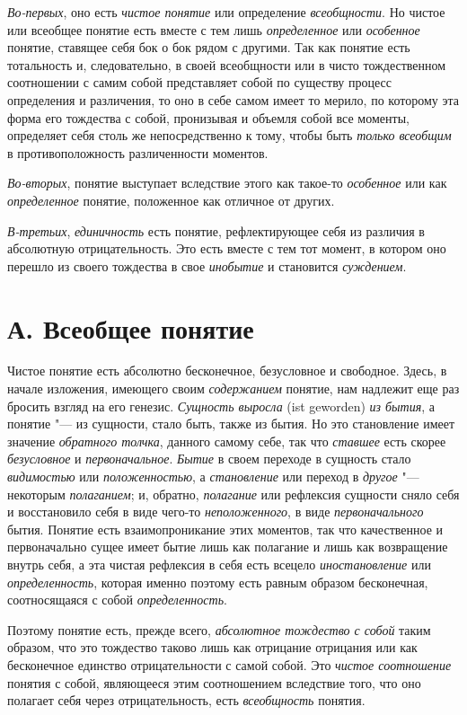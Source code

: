 {\em Во-первых}, оно есть
{\em чистое понятие} или
определение {\em всеобщности}.
Но чистое или всеобщее понятие есть вместе с тем лишь
{\em определенное} или
{\em особенное} понятие,
ставящее себя бок о бок рядом с другими. Так как понятие есть тотальность
и, следовательно, в своей всеобщности или в чисто тождественном соотношении
с самим собой представляет собой по существу процесс определения и
различения, то оно в себе самом имеет то мерило, по которому эта форма его
тождества с собой, пронизывая и объемля собой все моменты, определяет себя
столь же непосредственно к тому, чтобы быть
{\em только всеобщим }в
противоположность различенности моментов.

{\em Во-вторых}, понятие
выступает вследствие этого как такое-то
{\em особенное} или как
{\em определенное}
понятие, положенное как отличное от других.

{\em В-третьих},
{\em единичность} есть
понятие, рефлектирующее себя из различия в абсолютную отрицательность. Это
есть вместе с тем тот момент, в котором оно перешло из своего тождества в
свое {\em инобытие} и
становится {\em суждением}.

\section[А. Всеобщее понятие]{А. Всеобщее понятие}
Чистое понятие есть абсолютно бесконечное, безусловное и
свободное. Здесь, в начале изложения, имеющего своим
{\em содержанием}
понятие, нам надлежит еще раз бросить взгляд на его генезис.
{\em Сущность выросла} (ist geworden)
{\em из бытия}, а понятие
"--- из сущности, стало быть, также из бытия. Но это становление
имеет значение {\em обратного толчка},
данного самому себе, так что
{\em ставшее} есть скорее
{\em безусловное} и
{\em первоначальное}.
{\em Бытие} в своем
переходе в сущность стало
{\em видимостью} или
{\em положенностью}, а
{\em становление} или
переход в {\em другое}
"--- некоторым
{\em полаганием}; и,
обратно, {\em полагание}
или рефлексия сущности сняло себя и восстановило себя в виде
чего-то {\em неположенного},
в виде
{\em первоначального}
бытия. Понятие есть взаимопроникание этих моментов, так что
качественное и первоначально сущее имеет бытие лишь как полагание и лишь
как возвращение внутрь себя, а эта чистая рефлексия в себя есть
всецело {\em иностановление}
или {\em определенность},
которая именно поэтому есть равным образом бесконечная,
соотносящаяся с собой
{\em определенность}.

Поэтому понятие есть, прежде всего,
{\em абсолютное тождество с собой}
таким образом, что это тождество таково лишь как отрицание
отрицания или как бесконечное единство отрицательности с самой собой. Это
{\em чистое соотношение}
понятия с собой, являющееся этим соотношением вследствие
того, что оно полагает себя через отрицательность, есть
{\em всеобщность}
понятия.

